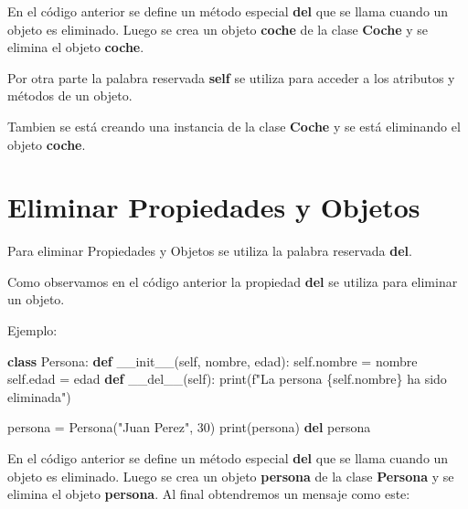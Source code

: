 \documentclass[
  a4paper,
  DIV=11,
  numbers=noendperiod,
  onepage,
  openany]{scrreprt}
\newenvironment{Shaded}{\begin{snugshade}}{\end{snugshade}}
\newcommand{\BuiltInTok}[1]{\textcolor[rgb]{0.00,0.23,0.31}{#1}}
\newcommand{\DecValTok}[1]{\textcolor[rgb]{0.68,0.00,0.00}{#1}}
\newcommand{\FunctionTok}[1]{\textcolor[rgb]{0.28,0.35,0.67}{#1}}
\newcommand{\KeywordTok}[1]{\textcolor[rgb]{0.00,0.23,0.31}{\textbf{#1}}}
\newcommand{\NormalTok}[1]{\textcolor[rgb]{0.00,0.23,0.31}{#1}}
\newcommand{\OperatorTok}[1]{\textcolor[rgb]{0.37,0.37,0.37}{#1}}
\newcommand{\SpecialCharTok}[1]{\textcolor[rgb]{0.37,0.37,0.37}{#1}}
\newcommand{\SpecialStringTok}[1]{\textcolor[rgb]{0.13,0.47,0.30}{#1}}
\newcommand{\StringTok}[1]{\textcolor[rgb]{0.13,0.47,0.30}{#1}}
\newcommand{\VariableTok}[1]{\textcolor[rgb]{0.07,0.07,0.07}{#1}}
\begin{document}
En el código anterior se define un método especial \textbf{\textbf{del}}
que se llama cuando un objeto es eliminado. Luego se crea un objeto
\textbf{coche} de la clase \textbf{Coche} y se elimina el objeto
\textbf{coche}.

Por otra parte la palabra reservada \textbf{self} se utiliza para
acceder a los atributos y métodos de un objeto.

Tambien se está creando una instancia de la clase \textbf{Coche} y se
está eliminando el objeto \textbf{coche}.

\section{Eliminar Propiedades y
Objetos}\label{eliminar-propiedades-y-objetos}

Para eliminar Propiedades y Objetos se utiliza la palabra reservada
\textbf{del}.

Como observamos en el código anterior la propiedad \textbf{\textbf{del}}
se utiliza para eliminar un objeto.

Ejemplo:

\begin{Shaded}
\begin{Highlighting}[]
\KeywordTok{class}\NormalTok{ Persona:}
    \KeywordTok{def} \FunctionTok{\_\_init\_\_}\NormalTok{(}\VariableTok{self}\NormalTok{, nombre, edad):}
        \VariableTok{self}\NormalTok{.nombre }\OperatorTok{=}\NormalTok{ nombre}
        \VariableTok{self}\NormalTok{.edad }\OperatorTok{=}\NormalTok{ edad}
    \KeywordTok{def} \FunctionTok{\_\_del\_\_}\NormalTok{(}\VariableTok{self}\NormalTok{):}
        \BuiltInTok{print}\NormalTok{(}\SpecialStringTok{f"La persona }\SpecialCharTok{\{}\VariableTok{self}\SpecialCharTok{.}\NormalTok{nombre}\SpecialCharTok{\}}\SpecialStringTok{ ha sido eliminada"}\NormalTok{)}

\NormalTok{persona }\OperatorTok{=}\NormalTok{ Persona(}\StringTok{"Juan Perez"}\NormalTok{, }\DecValTok{30}\NormalTok{)}
\BuiltInTok{print}\NormalTok{(persona)}
\KeywordTok{del}\NormalTok{ persona}
\end{Highlighting}
\end{Shaded}

En el código anterior se define un método especial \textbf{\textbf{del}}
que se llama cuando un objeto es eliminado. Luego se crea un objeto
\textbf{persona} de la clase \textbf{Persona} y se elimina el objeto
\textbf{persona}. Al final obtendremos un mensaje como este:
\end{document}
